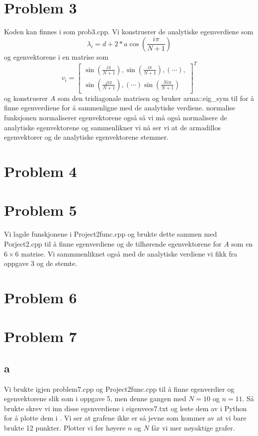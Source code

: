 \documentclass[reprint,english,notitlepage]{revtex4-1}  %
\begin{document}
\section*{Problem 3}
Koden kan finnes i som prob3.cpp.
\newline Vi konstruerer de analytiske egenverdiene som
$$
\lambda_i=d+2*a\cos(\frac{i\pi}{N+1})
$$
og egenvektorene i en matrise som
$$
v_i=\begin{bmatrix}\sin(\frac{i\pi}{N+1}), \sin(\frac{i\pi}{N+1}), (\cdots), \\
\sin(\frac{ji\pi}{N+1}), (\cdots) \sin(\frac{Ni\pi}{N+1})
\end{bmatrix}^T
$$
og konstruerer $A$ som den tridiagonale matrisen og bruker arma::eig\_sym til for å finne egenverdiene for å sammenligne med de analytiske verdiene. normalise funksjonen normaliserer egenvektorene også så vi må også normalisere de analytiske egenvektorene og sammenlikner vi nå ser vi at de armadillos egenvektorer og de analytiske egenvektorene stemmer.
\section*{Problem 4}
\section*{Problem 5}
Vi lagde funskjonene i Project2func.cpp og brukte dette sammen med Porject2.cpp til å finne egenverdiene og de tilhørende egenvektorene for $A$ som  en $6\times6$ matrise. Vi sammmenliknet også med de analytiske verdiene vi fikk fra oppgave 3 og de stemte.
\section*{Problem 6}
\section{Problem 7}
\subsection*{a}
Vi brukte igjen problem7.cpp og Project2func.cpp til å finne egenverdier og egenvektorene slik som i oppgave 5, men denne gangen med $N=10$ og $n=11$. Så brukte skrev vi inn disse egenverdiene i eigenvecs7.txt og leste dem av i Python for å plotte dem i . Vi ser at grafene ikke er så jevne som kommer av at vi bare brukte 12 punkter. Plotter vi før høyere $n$ og $N$ får vi mer nøyaktige grafer.
\end{document}
